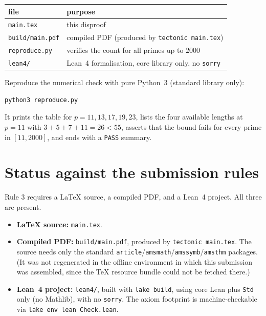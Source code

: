 \documentclass[11pt]{article}
\theoremstyle{definition}
\theoremstyle{remark}
\begin{document}
\begin{center}
\begin{tabular}{l|l}
file & purpose \\ \hline
\texttt{main.tex} & this disproof \\
\texttt{build/main.pdf} & compiled PDF (produced by \texttt{tectonic main.tex}) \\
\texttt{reproduce.py} & verifies the count for all primes up to $2000$ \\
\texttt{lean4/} & Lean~4 formalisation, core library only, no \texttt{sorry} \\
\end{tabular}
\end{center}

Reproduce the numerical check with pure Python~3 (standard library only):

\begin{verbatim}
python3 reproduce.py
\end{verbatim}

It prints the table for $p = 11, 13, 17, 19, 23$, lists the four available
lengths at $p = 11$ with $3+5+7+11 = 26 < 55$, asserts that the bound fails for
every prime in $[11,2000]$, and ends with a \texttt{PASS} summary.

\section*{Status against the submission rules}

Rule 3 requires a LaTeX source, a compiled PDF, and a Lean~4 project. All three
are present.

\begin{itemize}
\item \textbf{LaTeX source:} \texttt{main.tex}.
\item \textbf{Compiled PDF:} \texttt{build/main.pdf}, produced by
      \texttt{tectonic main.tex}. The source needs only the standard
      \texttt{article}/\texttt{amsmath}/\texttt{amssymb}/\texttt{amsthm}
      packages. (It was not regenerated in the offline environment in which
      this submission was assembled, since the TeX resource bundle could not
      be fetched there.)
\item \textbf{Lean~4 project:} \texttt{lean4/}, built with \texttt{lake build},
      using core Lean plus \texttt{Std} only (no Mathlib), with no
      \texttt{sorry}. The axiom footprint is machine-checkable via
      \texttt{lake env lean Check.lean}.
\end{itemize}
\end{document}
